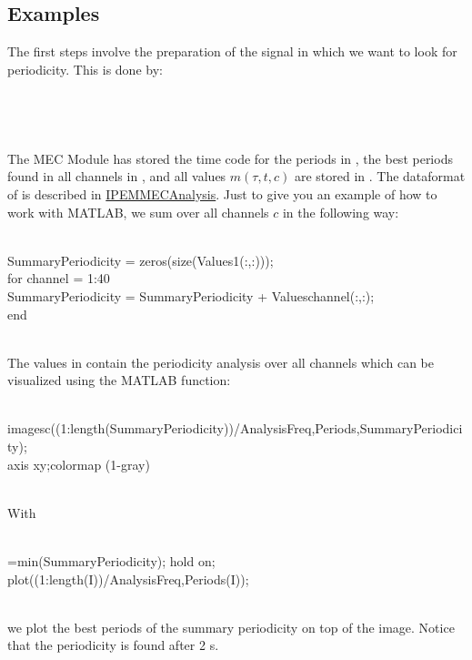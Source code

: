 \subsection*{Examples}
The first steps involve the preparation of the signal in which we want to
look for periodicity.
This is done by:\\\\
\\
\\
\\
The MEC Module has stored the time code for the periods in
, the best periods found in all channels
in , and all values $m(\tau,t,c)$ are
stored in . The dataformat of
 is described in
\hyperlink{FuncRef:IPEMMECAnalysis}{IPEMMECAnalysis}. Just to give
you an example of how to work with MATLAB, we sum over all
channels $c$ in the
following way:\\\\
 \begin{IPEMCodeEnvironment}
 SummaryPeriodicity = zeros(size(Values{1}(:,:))); \\
 for channel = 1:40\\
  SummaryPeriodicity = SummaryPeriodicity + Values{channel}(:,:);\\
 end\\
\end{IPEMCodeEnvironment}\\
The values in  contain the
periodicity analysis over all channels which can be visualized
using the MATLAB function:\\\\
 \begin{IPEMCodeEnvironment}
  imagesc((1:length(SummaryPeriodicity))/AnalysisFreq,Periods,SummaryPeriodicity);\\
  axis xy;colormap (1-gray)\\
\end{IPEMCodeEnvironment}\\
With\\\\
 \begin{IPEMCodeEnvironment}
 [M,I]=min(SummaryPeriodicity); hold on;\\
 plot((1:length(I))/AnalysisFreq,Periods(I));\\
\end{IPEMCodeEnvironment}\\
we plot the best periods of the summary periodicity on top of the
image. Notice that the periodicity is found after 2 s.
